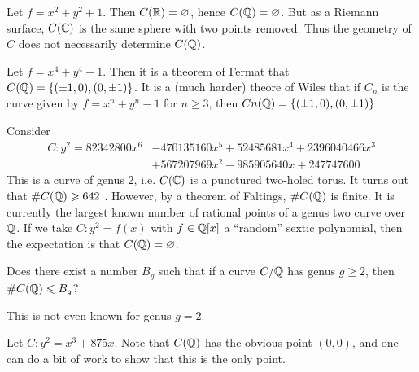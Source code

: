 \documentclass{article}
\begin{document}
\begin{example}
Let $f=x^2+y^2+1$. Then $C(\mathbb{R})=\varnothing$, hence $C(\mathbb{Q})=\varnothing$. But 
as a Riemann surface, $C(\mathbb{C})$ is the same sphere with two points removed. Thus 
the geometry of $C$ does not necessarily determine $C(\mathbb{Q})$. 
\end{example}

\begin{example}
Let $f=x^4+y^4-1$. Then it is a theorem of Fermat that 
$C(\mathbb{Q})=\{(\pm 1,0),(0,\pm 1)\}$. It is a (much harder) theore of Wiles that if 
$C_n$ is the curve given by $f=x^n+y^n-1$ for $n\geqslant 3$, then 
$Cn(\mathbb{Q})=\{(\pm 1,0),(0,\pm 1)\}$. 
\end{example}

\begin{example}[Stoll]
Consider 
\begin{align*}
  C : y^2 = 82342800 x^6 &- 470135160 x^5 + 52485681 x^4 + 2396040466 x^3 \\
    &+ 567207969 x^2 - 985905640 x + 247747600
\end{align*}
This is a curve of genus 2, i.e. $C(\mathbb{C})$ is a punctured two-holed 
torus. It turns out that $\# C(\mathbb{Q})\geqslant 642$ \cite[\S 6]{st09}. 
However, by a theorem of Faltings, $\# C(\mathbb{Q})$ is finite. It is 
currently the largest known number of rational points of a genus two curve 
over $\mathbb{Q}$. If we take $C:y^2=f(x)$ with $f\in\mathbb{Q}[x]$ a 
``random'' sextic polynomial, then the expectation is that 
$C(\mathbb{Q})=\varnothing$. 
\end{example}

\begin{question}
Does there exist a number $B_g$ such that if a curve $C/\mathbb{Q}$ has 
genus $g\geqslant 2$, then $\# C(\mathbb{Q})\leqslant B_g$?
\end{question}

This is not even known for genus $g=2$. 

\begin{example}
Let $C:y^2=x^3+875 x$. Note that $C(\mathbb{Q})$ has the obvious point 
$(0,0)$, and one can do a bit of work to show that this is the only point. 
\end{example}
\end{document}
